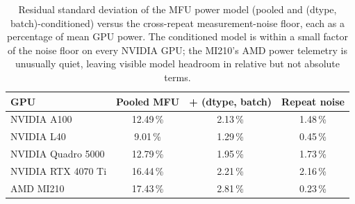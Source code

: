 \begin{table}[t]
\centering
\caption{Residual standard deviation of the MFU power model (pooled and (dtype, batch)-conditioned) versus the cross-repeat measurement-noise floor, each as a percentage of mean GPU power. The conditioned model is within a small factor of the noise floor on every NVIDIA GPU; the MI210's AMD power telemetry is unusually quiet, leaving visible model headroom in relative but not absolute terms.}
\label{tab:noise_floor}
\small
\setlength{\tabcolsep}{4pt}
\renewcommand{\arraystretch}{1.15}
\begin{tabular}{lccc}
    \toprule
    \textbf{GPU} & \textbf{Pooled MFU} & \textbf{+ (dtype, batch)} & \textbf{Repeat noise} \\
    \midrule
        NVIDIA A100 & 12.49\,\% & 2.13\,\% & 1.48\,\% \\
        NVIDIA L40 & 9.01\,\% & 1.29\,\% & 0.45\,\% \\
        NVIDIA Quadro 5000 & 12.79\,\% & 1.95\,\% & 1.73\,\% \\
        NVIDIA RTX 4070 Ti & 16.44\,\% & 2.21\,\% & 2.16\,\% \\
        AMD MI210 & 17.43\,\% & 2.81\,\% & 0.23\,\% \\
    \bottomrule
\end{tabular}
\end{table}
